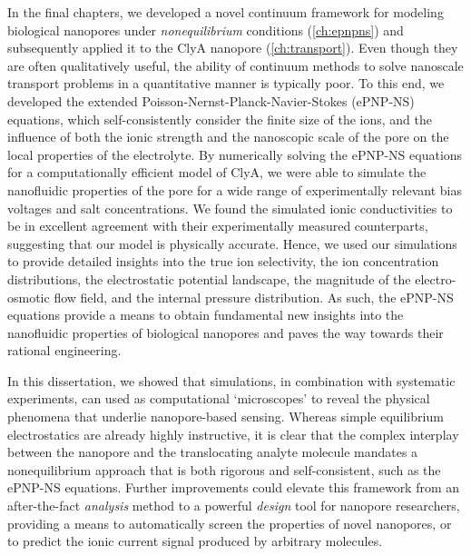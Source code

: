 In the final chapters, we developed a novel continuum framework for modeling biological nanopores under
\emph{nonequilibrium} conditions (\cref{ch:epnpns}) and subsequently applied it to the ClyA nanopore
(\cref{ch:transport}). Even though they are often qualitatively useful, the ability of continuum methods to
solve nanoscale transport problems in a quantitative manner is typically poor. To this end, we developed the
extended Poisson-Nernst-Planck-Navier-Stokes ({ePNP-NS}) equations, which self-consistently consider the
finite size of the ions, and the influence of both the ionic strength and the nanoscopic scale of the pore on
the local properties of the electrolyte. By numerically solving the {ePNP-NS} equations for a computationally
efficient model of ClyA, we were able to simulate the nanofluidic properties of the pore for a wide range of
experimentally relevant bias voltages and salt concentrations. We found the simulated ionic conductivities to
be in excellent agreement with their experimentally measured counterparts, suggesting that our model is
physically accurate. Hence, we used our simulations to provide detailed insights into the true ion
selectivity, the ion concentration distributions, the electrostatic potential landscape, the magnitude of the
electro-osmotic flow field, and the internal pressure distribution. As such, the {ePNP-NS} equations provide a
means to obtain fundamental new insights into the nanofluidic properties of biological nanopores and paves the
way towards their rational engineering.

In this dissertation, we showed that simulations, in combination with systematic experiments, can used as
computational `microscopes' to reveal the physical phenomena that underlie nanopore-based sensing. Whereas
simple equilibrium electrostatics are already highly instructive, it is clear that the complex interplay
between the nanopore and the translocating analyte molecule mandates a nonequilibrium approach that is both
rigorous and self-consistent, such as the {ePNP-NS} equations. Further improvements could elevate this
framework from an after-the-fact \emph{analysis} method to a powerful \emph{design} tool for nanopore
researchers, providing a means to automatically screen the properties of novel nanopores, or to predict the
ionic current signal produced by arbitrary molecules.


\cleardoublepage

